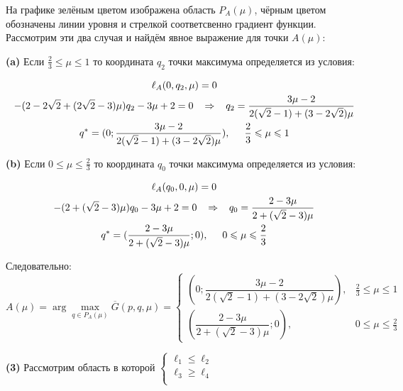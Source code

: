\begin{flushleft}
	На графике зелёным цветом изображена область $P_A(\mu)$, чёрным цветом
	обозначены линии уровня и стрелкой соответсвенно градиент функции.
	Рассмотрим эти два случая и найдём явное выражение для точки $A(\mu)$:

	\textbf{(a)} Если $\frac{2}{3} \leqslant \mu \leqslant 1$ то координата $q_2$ точки 
	максимума определяется из условия: 	
	
	\begin{gather*}	
		\ell_A(0,q_2,\mu)=0 
		\\
		-(2-2\sqrt{2}+(2\sqrt{2}-3)\mu)q_2
		-3\mu+2=0
		\hspace{3mm} \Rightarrow \hspace{3mm}
		q_2=\frac{3\mu-2}{2(\sqrt{2}-1)+(3-2\sqrt{2})\mu}	
		\\
		q^*= (0;\dfrac{3\mu-2}{2(\sqrt{2}-1)+(3-2\sqrt{2})\mu}), 
		\hspace{5mm} \frac{2}{3} \leqslant \mu \leqslant 1
	\end{gather*}


	\textbf{(b)} Если $0 \leqslant \mu \leqslant \frac{2}{3}$ то координата $q_0$ точки 
	максимума определяется из условия: 	
	
	\begin{gather*}
		\ell_A(q_0,0,\mu)=0	
		\\
		-(2+(\sqrt{2}-3)\mu)q_0
		-3\mu+2=0	
		\hspace{3mm} \Rightarrow \hspace{3mm}
		q_0=\frac{2-3\mu}{2+(\sqrt{2}-3)\mu}	
		\\
		q^*= (\dfrac{2-3\mu}{2+(\sqrt{2}-3)\mu};0), 
		\hspace{5mm} 0 \leqslant \mu \leqslant \frac{2}{3}	
	\end{gather*}
	
	Следовательно:
	\begin{equation} \label{eq:A}
		A(\mu) = \arg \max \limits_{q\in P_A(\mu)} \overline G(p,q,\mu) = 
		\begin{cases}
			(0;\dfrac{3\mu-2}{2(\sqrt{2}-1)+(3-2\sqrt{2})\mu})
			, & \frac{2}{3} \leqslant \mu \leqslant 1 \\
			(\dfrac{2-3\mu}{2+(\sqrt{2}-3)\mu};0), & 0 \leqslant \mu \leqslant \frac{2}{3}	
		\end{cases}
	\end{equation}


	\textbf{(3)} Рассмотрим область в которой
	$\begin{cases}
		\ell_1 \leqslant \ell_2 \\	
		\ell_3 \geqslant \ell_4 \\
	\end{cases}	
	$
	

\end{flushleft}
